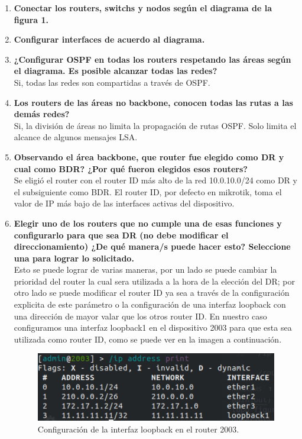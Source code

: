 \documentclass[letterpaper,12pt]{article}
\begin{document}
	\begin{enumerate}
		\item \textbf{Conectar los routers, switchs y nodos según el diagrama de la figura 1.}
		\item \textbf{Configurar interfaces de acuerdo al diagrama.}
		\item \textbf{¿Configurar OSPF en todas los routers respetando las áreas según el diagrama. Es posible alcanzar todas las redes?} \\
		Si, todas las redes son compartidas a través de OSPF.
		\item \textbf{Los routers de las áreas no backbone, conocen todas las rutas a las demás redes?}\\
		Si, la división de áreas no limita la propagación de rutas OSPF. Solo limita el alcance de algunos mensajes LSA.
		\item \textbf{Observando el área backbone, que router fue elegido como DR y cual como BDR? ¿Por qué fueron elegidos esos routers?}\\
		Se eligió el router con el router ID más alto de la red 10.0.10.0/24 como DR y el subsiguiente como BDR. El router ID, por defecto en mikrotik, toma el valor de IP más bajo de las interfaces activas del dispositivo.
		\item \textbf{Elegir uno de los routers que no cumple una de esas funciones y configurarlo para que sea DR (no debe modificar el direccionamiento) ¿De qué manera/s puede hacer esto? Seleccione una para lograr lo solicitado.}\\
		Esto se puede lograr de varias maneras, por un lado se puede cambiar la prioridad del router la cual sera utilizada a la hora de la elección del DR; por otro lado se puede modificar el router ID ya sea a través de la configuración explicita de este parámetro o la configuración de una interfaz loopback con una dirección de mayor valar que los otros router ID. En nuestro caso configuramos una interfaz loopback1 en el dispositivo 2003 para que esta sea utilizada como router ID, como se puede ver en la imagen a continuación.
		\begin{figure}[H] 
			
			\centering \includegraphics[width=0.5\columnwidth]{figure/int_loopback.png}
			\caption{
					\label{fig:samplesetup} %
					Configuración de la interfaz loopback en el router 2003.
			}
		\end{figure} 
		\begin{figure}[H] 
			

\end{figure}
\end{enumerate}
\end{document}
